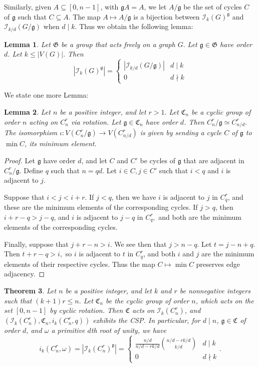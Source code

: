 \documentclass[12pt]{article}
\newtheorem{theorem}{Theorem}%
\newtheorem{lemma}[theorem]{Lemma}
\theoremstyle{definition}
\begin{document}
Similarly, given $A \subseteq [0,n-1]$, with $\mathfrak{g}A = A$, we let $A/\mathfrak{g}$ be the set of cycles $C$ of $\mathfrak{g}$ such that $C \subseteq A$. The map $A \mapsto A/\mathfrak{g}$ is a bijection between $\mathcal{I}_k(G)^{\mathfrak{g}}$ and $\mathcal{I}_{k/d}(G/\mathfrak{g})$ when $d \mid k.$ Thus we obtain the following lemma:
\begin{lemma}
Let $\mathfrak{G}$ be a group that acts freely on a graph $G.$ Let 
$\mathfrak{g} \in \mathfrak{G}$ have order $d$. Let $k \leq |V(G)|.$ Then 
\[|\mathcal{I}_k(G)^{\mathfrak{g}}| = \begin{cases} |\mathcal{I}_{k/d}(G/\mathfrak{g})| & d \mid k \\ 0 & d \nmid k \end{cases}\]
\label{lem:quotient}
\end{lemma}
We state one more Lemma:
\begin{lemma}
Let $n$ be a positive integer, and let $r > 1.$
Let $\mathfrak{C}_n$ be a cyclic group of order $n$ acting on $C_n^r$ via rotation. 
Let $\mathfrak{g} \in \mathfrak{C}_n$ have order $d$. Then $C_n^r/\mathfrak{g} \simeq C_{n/d}^r.$
The isomorphism $\iota:V(C_n^r/\mathfrak{g}) \to V(C_{n/d}^r)$ is given by sending a cycle $C$ of $\mathfrak{g}$ to $\min C$, its minimum element.
\label{lem:isomorphism}
\end{lemma}
\begin{proof}
Let $\mathfrak{g}$ have order $d$, and let $C$ and $C'$ be cycles of $\mathfrak{g}$ that are adjacent in $C^r_n/\mathfrak{g}.$ Define $q$ such that $n=qd$. Let $i \in C, j \in C'$ such that $i < q$ and $i$ is adjacent to $j$.

Suppose that $i < j < i+r$. If $j < q$, then we have $i$ is adjacent to $j$ in $C_{q}^r$, and these are the minimum elements of the corresponding cycles. If $j > q$, then $i+r-q > j - q$, and $i$ is adjacent to $j-q$ in $C_q^r,$ and both are the minimum elements of the corresponding cycles.

Finally, suppose that $j+r-n > i$. We see then that $j> n-q$. Let $t = j-n+q.$ Then $t+r-q > i,$ so $i$ is adjacent to $t$ in $C_q^r$, and both $i$ and $j$ are the minimum elements of their respective cycles. Thus the map $C \mapsto \min C$ preserves edge adjacency.
\end{proof}


\begin{theorem}
Let $n$ be a positive integer, and let $k$ and $r$ be nonnegative integers such that $(k+1)r \leq n.$ Let $\mathfrak{C}_n$ be the cyclic group of order $n$, which acts on the set $[0,n-1]$ by cyclic rotation. Then $\mathfrak{C}$ acts on $\mathcal{I}_k(C^r_n)$, and 
$(\mathcal{I}_k(C^r_n), \mathfrak{C}_n, i_k(C^r_n,q))$ exhibits the CSP.
In particular, for $d \mid n$, $\mathfrak{g} \in \mathfrak{C}$ of order $d$, and $\omega$ a primitive $d$th root of unity, we have 
\[i_k(C^r_n,\omega) = |\mathcal{I}_k(C_n^r)^{\mathfrak{g}}| = \begin{cases} \frac{n/d}{n/d-rk/d}\binom{n/d-rk/d}{k/d} & d \mid k \\ 0 & d \nmid k \end{cases}.\]
\end{theorem}
\end{document}
